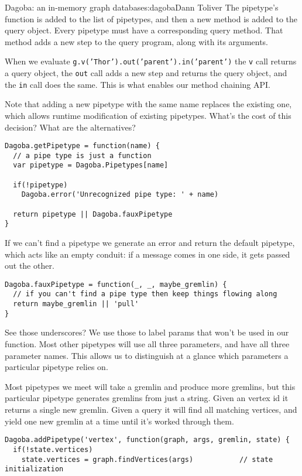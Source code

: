 \begin{aosachapter}{Dagoba: an in-memory graph database}{s:dagoba}{Dann Toliver}
The pipetype's function is added to the list of pipetypes, and then a
new method is added to the query object. Every pipetype must have a
corresponding query method. That method adds a new step to the query
program, along with its arguments.

When we evaluate \texttt{g.v('Thor').out('parent').in('parent')} the
\texttt{v} call returns a query object, the \texttt{out} call adds a new
step and returns the query object, and the \texttt{in} call does the
same. This is what enables our method chaining API.

Note that adding a new pipetype with the same name replaces the existing
one, which allows runtime modification of existing pipetypes. What's the
cost of this decision? What are the alternatives?

\begin{verbatim}
Dagoba.getPipetype = function(name) {
  // a pipe type is just a function 
  var pipetype = Dagoba.Pipetypes[name]                 

  if(!pipetype)
    Dagoba.error('Unrecognized pipe type: ' + name)

  return pipetype || Dagoba.fauxPipetype
}
\end{verbatim}

If we can't find a pipetype we generate an error and return the default
pipetype, which acts like an empty conduit: if a message comes in one
side, it gets passed out the other.

\begin{verbatim}
Dagoba.fauxPipetype = function(_, _, maybe_gremlin) {   
  // if you can't find a pipe type then keep things flowing along
  return maybe_gremlin || 'pull'                        
}
\end{verbatim}

See those underscores? We use those to label params that won't be used
in our function. Most other pipetypes will use all three parameters, and
have all three parameter names. This allows us to distinguish at a
glance which parameters a particular pipetype relies on.

\label{vertex}

Most pipetypes we meet will take a gremlin and produce more gremlins,
but this particular pipetype generates gremlins from just a string.
Given an vertex id it returns a single new gremlin. Given a query it
will find all matching vertices, and yield one new gremlin at a time
until it's worked through them.

\begin{verbatim}
Dagoba.addPipetype('vertex', function(graph, args, gremlin, state) {
  if(!state.vertices) 
    state.vertices = graph.findVertices(args)           // state initialization


\end{verbatim}
\end{aosachapter}
